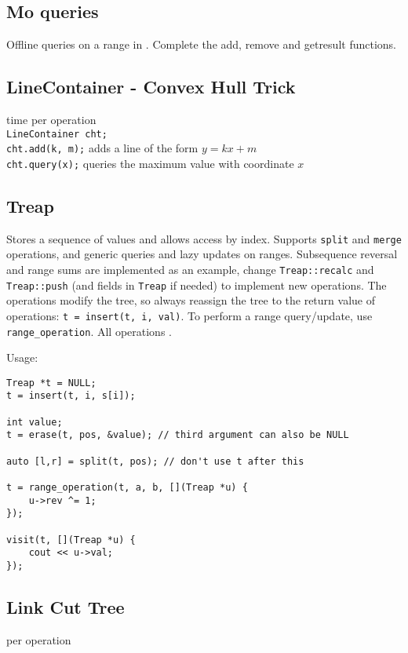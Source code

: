 \subsection{Mo queries}
Offline queries on a range in . Complete the add, remove and getresult functions.

\subsection{LineContainer - Convex Hull Trick}

 time per operation \\
\verb|LineContainer cht;| \\
\verb|cht.add(k, m);| adds a line of the form $y = kx + m$ \\
\verb|cht.query(x);| queries the maximum value with coordinate $x$ \\

\subsection{Treap}

Stores a sequence of values and allows access by index. Supports \texttt{split} and \texttt{merge} operations, and generic queries and lazy updates on ranges. Subsequence reversal and range sums are implemented as an example, change \texttt{Treap::recalc} and \texttt{Treap::push} (and fields in \texttt{Treap} if needed) to implement new operations.
The operations modify the tree, so always reassign the tree to the return value of operations: \texttt{t = insert(t, i, val)}. To perform a range query/update, use \texttt{range\_operation}.
All operations .

Usage:
\begin{lstlisting}
Treap *t = NULL;
t = insert(t, i, s[i]);

int value;
t = erase(t, pos, &value); // third argument can also be NULL

auto [l,r] = split(t, pos); // don't use t after this

t = range_operation(t, a, b, [](Treap *u) {
	u->rev ^= 1;
});

visit(t, [](Treap *u) {
	cout << u->val;
});
\end{lstlisting}


\subsection{Link Cut Tree}
 per operation
